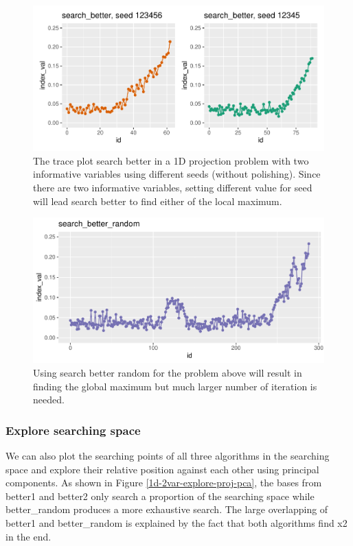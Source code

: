 \documentclass[12pt]{article}
\begin{document}
\begin{figure}
\centering
\includegraphics{paper_files/figure-latex/1d-2var-different-seeds-1.pdf}
\caption{\label{1d-2var-different-seeds}The trace plot search better in
a 1D projection problem with two informative variables using different
seeds (without polishing). Since there are two informative variables,
setting different value for seed will lead search better to find either
of the local maximum.}
\end{figure}

\begin{figure}
\centering
\includegraphics{paper_files/figure-latex/1d-2var-better-random-1.pdf}
\caption{\label{1d-2var-better-random}Using search better random for the
problem above will result in finding the global maximum but much larger
number of iteration is needed.}
\end{figure}

\hypertarget{explore-searching-space-1}{%
\subsubsection{Explore searching
space}\label{explore-searching-space-1}}

We can also plot the searching points of all three algorithms in the
searching space and explore their relative position against each other
using principal components. As shown in Figure
\ref{1d-2var-explore-proj-pca}, the bases from better1 and better2 only
search a proportion of the searching space while better\_random produces
a more exhaustive search. The large overlapping of better1 and
better\_random is explained by the fact that both algorithms find x2 in
the end.
\end{document}
